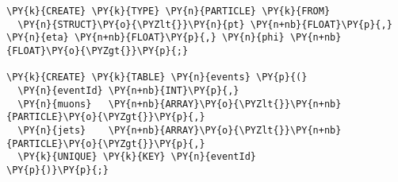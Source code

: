 \begin{Verbatim}[commandchars=\\\{\}]
\PY{k}{CREATE} \PY{k}{TYPE} \PY{n}{PARTICLE} \PY{k}{FROM}
  \PY{n}{STRUCT}\PY{o}{\PYZlt{}}\PY{n}{pt} \PY{n+nb}{FLOAT}\PY{p}{,} \PY{n}{eta} \PY{n+nb}{FLOAT}\PY{p}{,} \PY{n}{phi} \PY{n+nb}{FLOAT}\PY{o}{\PYZgt{}}\PY{p}{;}

\PY{k}{CREATE} \PY{k}{TABLE} \PY{n}{events} \PY{p}{(}
  \PY{n}{eventId} \PY{n+nb}{INT}\PY{p}{,}
  \PY{n}{muons}   \PY{n+nb}{ARRAY}\PY{o}{\PYZlt{}}\PY{n+nb}{PARTICLE}\PY{o}{\PYZgt{}}\PY{p}{,}
  \PY{n}{jets}    \PY{n+nb}{ARRAY}\PY{o}{\PYZlt{}}\PY{n+nb}{PARTICLE}\PY{o}{\PYZgt{}}\PY{p}{,}
  \PY{k}{UNIQUE} \PY{k}{KEY} \PY{n}{eventId}
\PY{p}{)}\PY{p}{;}
\end{Verbatim}
